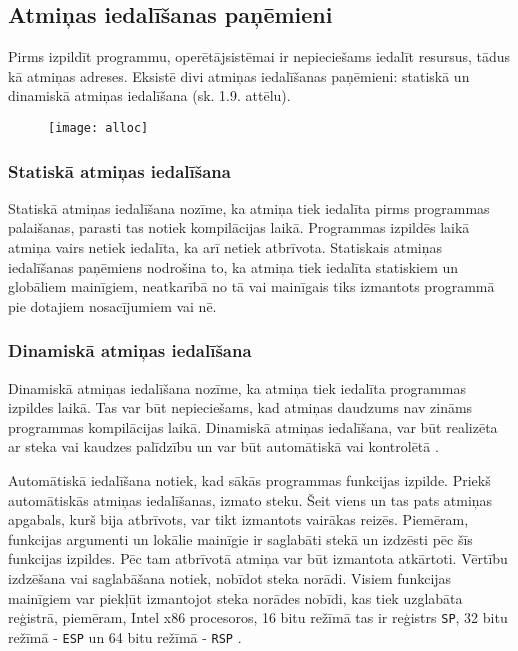 \subsection{Atmiņas iedalīšanas paņēmieni}

Pirms izpildīt programmu, operētājsistēmai ir nepieciešams iedalīt resursus, tādus kā atmiņas adreses.  
Eksistē divi atmiņas iedalīšanas paņēmieni: statiskā un dinamiskā atmiņas iedalīšana (sk. 1.9. attēlu). 

\begin{figure}[h]
\begin{center}
\texttt{[image: alloc]}
\end{center}
\caption{\textbf{\fontsize{11}{12}\selectfont {Atmiņas iedalīšanas paņēmienu klasifikācija}}}
\label{fig:alloc}
\end{figure}


\subsubsection{Statiskā atmiņas iedalīšana}
Statiskā atmiņas iedalīšana nozīme, ka atmiņa tiek iedalīta pirms programmas palaišanas, parasti tas notiek kompilācijas laikā.
Programmas izpildēs laikā atmiņa vairs netiek iedalīta, ka arī netiek atbrīvota. 
Statiskais atmiņas iedalīšanas paņēmiens nodrošina to, ka atmiņa tiek iedalīta statiskiem un globāliem mainīgiem, neatkarībā no tā vai mainīgais tiks izmantots programmā pie dotajiem nosacījumiem vai nē.

\subsubsection{Dinamiskā atmiņas iedalīšana}
Dinamiskā atmiņas iedalīšana nozīme, ka atmiņa tiek iedalīta programmas izpildes laikā.
Tas var būt nepieciešams, kad atmiņas daudzums nav zināms programmas kompilācijas laikā. 
Dinamiskā atmiņas iedalīšana, var būt realizēta ar steka vai kaudzes palīdzību un var būt automātiskā vai kontrolētā \cite{SDMA}.

Automātiskā iedalīšana notiek, kad sākās programmas funkcijas izpilde. 
Priekš automātiskās atmiņas iedalīšanas, izmato steku.
Šeit viens un tas pats atmiņas apgabals, kurš bija atbrīvots, var tikt izmantots  vairākas reizēs. 
Piemēram, funkcijas argumenti un lokālie mainīgie ir saglabāti stekā un izdzēsti pēc šīs funkcijas izpildes. 
Pēc tam atbrīvotā atmiņa var būt izmantota atkārtoti. 
Vērtību izdzēšana vai saglabāšana notiek, nobīdot steka norādi.
Visiem funkcijas mainīgiem var piekļūt izmantojot steka norādes nobīdi, kas tiek uzglabāta reģistrā, piemēram,  
Intel x86 procesoros, 16 bitu režīmā tas ir reģistrs \texttt{SP}, 32 bitu režīmā - \texttt{ESP} un 64 bitu režīmā - \texttt{RSP} \cite{JCL}.


